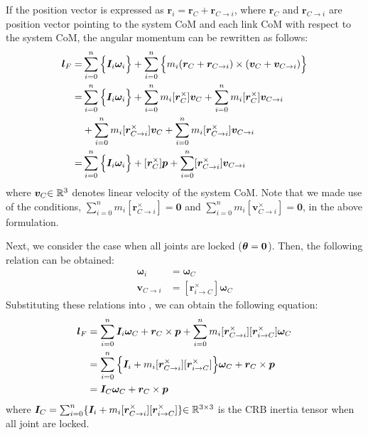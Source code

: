If the position vector is expressed as $\bm{r}_{i} = \bm{r}_{C} + \bm{r}_{C \rightarrow i}$,
where $\bm{r}_{C}$ and $\bm{r}_{C \rightarrow i}$ are position vector pointing to the system CoM and
each link CoM with respect to the system CoM,
the angular momentum can be rewritten as follows:
%
\begin{align}\label{eq:LF}
  \bm{l}_{F} = &\sum_{i=0}^{n}\Big\{\bm{I}_{i}\bm{\omega}_{i}\Big\} + 
  \sum_{i=0}^{n}\Big\{m_{i}(\bm{r}_{C} + \bm{r}_{C \rightarrow i})\times (\bm{v}_{C} + \bm{v}_{C \rightarrow i})\Big\}\\
  = &\sum_{i=0}^{n}\Big\{\bm{I}_{i}\bm{\omega}_{i}\Big\}
  + \sum_{i=0}^{n}m_{i}[\bm{r}_{C}^{\times}]\bm{v}_{C} + \sum_{i=0}^{n}m_{i}[\bm{r}_{C}^{\times}]\bm{v}_{C \rightarrow i}\notag\\
  &+ \sum_{i=0}^{n}m_{i}[\bm{r}_{C \rightarrow i}^{\times}]\bm{v}_{C} + \sum_{i=0}^{n}m_{i}[\bm{r}_{C \rightarrow i}^{\times}]\bm{v}_{C \rightarrow i}\notag\\
  = & \sum_{i=0}^{n}\Big\{\bm{I}_{i}\bm{\omega}_{i}\Big\} + [\bm{r}_{C}^{\times}]\bm{p} +
  \sum_{i=0}^{n}[\bm{r}_{C \rightarrow i}^{\times}]\bm{v}_{C \rightarrow i}\notag
\end{align}
%
where $\bm{v}_{C}{\in\mathbb{R}^{3}}$ denotes linear velocity of the system CoM.
Note that we made use of the conditions,
$\sum_{i=0}^{n}m_{i}[\bm{r}_{C \rightarrow i}^{\times}] = \bm{0}$ and
$\sum_{i=0}^{n}m_{i}[\bm{v}_{C \rightarrow i}^{\times}] = \bm{0}$, in the above formulation.

Next, we consider the case when all joints are locked (${\bm{\theta}} = \bm{0}$).
Then, the following relation can be obtained:
%
\begin{align}
  \bm{\omega}_{i} &= \bm{\omega}_{C}\\
  \bm{v}_{C \rightarrow i} &= [\bm{r}_{i \rightarrow C}^{\times}]\bm{\omega}_{C}
\end{align}
%
Substituting these relations into ,
we can obtain the following equation:
%
\begin{align}
  \bm{l}_{F} &= \sum_{i=0}^{n}\bm{I}_{i}\bm{\omega}_{C} + \bm{r}_{C} \times \bm{p}
  + \sum_{i=0}^{n}m_{i}[\bm{r}_{C \rightarrow i}^{\times}][\bm{r}_{i \rightarrow C}^{\times}]\bm{\omega}_{C}\\
  &= \sum_{i=0}^{n}\Big\{\bm{I}_{i} + m_{i}[\bm{r}_{C \rightarrow i}^{\times}][\bm{r}_{i \rightarrow C}^{\times}]\Big\}\bm{\omega}_{C} + \bm{r}_{C}\times \bm{p}\notag\\
  &= \bm{I}_{C}\bm{\omega}_{C} + \bm{r}_{C}\times \bm{p}\notag\label{eq:APP_ANG_MOM_F2}
\end{align}
%
where $\bm{I}_{C} = \sum_{i=0}^{n}\{\bm{I}_{i} + m_{i}[\bm{r}_{C \rightarrow i}^{\times}][\bm{r}_{i \rightarrow C}^{\times}]\}{\in\mathbb{R}^{3 \times 3}}$ is
the CRB inertia tensor when all joint are locked.

